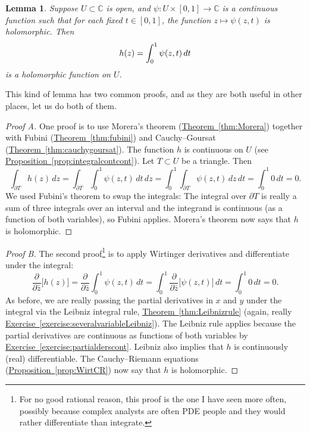\documentclass[12pt,openany]{book}
\newcommand{\avoidbreak}{\postdisplaypenalty=100}
\newcommand{\C}{{\mathbb{C}}}
\theoremstyle{plain}
\newtheorem{lemma}[thm]{Lemma}
\theoremstyle{remark}
\theoremstyle{definition}
\theoremstyle{exercise}
\theoremstyle{example}
\newcommand{\exerciseref}[1]{\hyperref[#1]{Exercise~\ref*{#1}}}
\newcommand{\thmref}[1]{\hyperref[#1]{Theorem~\ref*{#1}}}
\newcommand{\propref}[1]{\hyperref[#1]{Proposition~\ref*{#1}}}
\begin{document}
\begin{lemma} \label{lemma:holfuncbyintegral}
Suppose $U \subset \C$ is open, and
$\psi \colon U \times [0,1] \to \C$ is a continuous function such that
for each fixed $t \in [0,1]$, the function $z \mapsto \psi(z,t)$ is
holomorphic.  Then
\begin{equation*}
h(z) =
\int_0^1 \psi(z,t) \, dt
\avoidbreak
\end{equation*}
is a holomorphic function on $U$.
\end{lemma}

This kind of lemma has two common proofs,
and as they are both useful in other places, let us do both of them.

\begin{proof}[Proof A]
One proof is to use Morera's theorem (\thmref{thm:Morera})
together with Fubini (\thmref{thm:fubini}) and Cauchy--Goursat
(\thmref{thm:cauchygoursat}).
The function $h$ is continuous on $U$ (see \propref{prop:integralcontcont}).
Let $T \subset U$ be a triangle.  Then
\begin{equation*}
\int_{\partial T}
h(z)
\, dz
=
\int_{\partial T}
\int_0^1 \psi(z,t) \, dt
\, dz
=
\int_0^1
\int_{\partial T}
\psi(z,t)
\, dz
\, dt
= \int_0^1 0 \, dt = 0.
\end{equation*}
We used Fubini's theorem to swap the integrals:
The integral over $\partial T$ is really a sum of three integrals over an interval
and the integrand is continuous (as a function of both variables), so Fubini applies.
Morera's theorem now says that $h$ is
holomorphic.
\end{proof}

\begin{proof}[Proof B]
The second proof\footnote{%
For no good rational reason, this proof is the one I have seen more often,
possibly because complex analysts are often PDE
people and they would rather differentiate than integrate.}
is to apply Wirtinger derivatives and differentiate under the integral:
\begin{equation*}
\frac{\partial}{\partial \bar{z}}
\bigl[
h(z)
\bigr]
=
\frac{\partial}{\partial \bar{z}}
\int_0^1 \psi(z,t) \, dt
=
\int_0^1
\frac{\partial}{\partial \bar{z}}
\bigl[
\psi(z,t)
\bigr]
\, dt
= \int_0^1 0 \, dt = 0.
\end{equation*}
As before, we are really passing the partial derivatives in $x$
and $y$ under the integral via the Leibniz integral rule,
\thmref{thm:Leibnizrule} (again, really
\exerciseref{exercise:severalvariableLeibniz}).
The Leibniz rule applies because 
the partial
derivatives are continuous as functions of both variables
by \exerciseref{exercise:partialderscont}.
Leibniz also implies that $h$ is continuously (real) differentiable.
The Cauchy--Riemann equations
(\propref{prop:WirtCR}) now
say that $h$ is holomorphic.
\end{proof}
\end{document}
